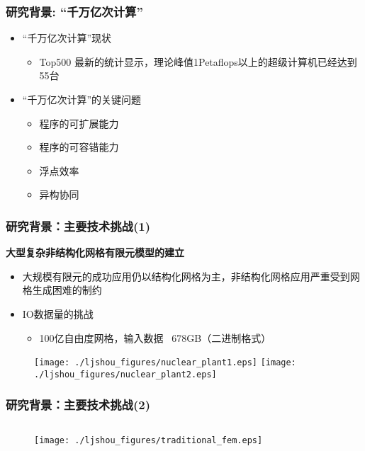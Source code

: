 \documentclass[mathserif]{beamer}
\begin{document}
\begin{CJK}{UTF8}{gkai}
	\begin{frame}
	  \frametitle{研究背景: “千万亿次计算”}
	  \begin{itemize}
		\item “千万亿次计算”现状
		   \begin{itemize}
			\item Top500 最新的统计显示，理论峰值1Petaflops以上的超级计算机已经达到55台
		   \end{itemize} 
		   
		\item “千万亿次计算”的关键问题
		   \begin{itemize}
			\item 程序的可扩展能力
			\item 程序的可容错能力
			\item 浮点效率
			\item 异构协同
		   \end{itemize}
	  \end{itemize}
	\end{frame}

	\begin{frame}
		\frametitle{研究背景：主要技术挑战(1)}
		{\color{red}\bf 大型复杂非结构化网格有限元模型的建立}
		\begin{itemize}
		  \item 大规模有限元的成功应用仍以结构化网格为主，非结构化网格应用严重受到网格生成困难的制约
		  \item IO数据量的挑战
		  \begin{itemize}
			\item 100亿自由度网格，输入数据 ~678GB（二进制格式）
		  \end{itemize}
		\end{itemize}
			\begin{figure}
				\centering
				\texttt{[image: ./ljshou\_figures/nuclear\_plant1.eps]}
				\texttt{[image: ./ljshou\_figures/nuclear\_plant2.eps]}
			\end{figure}
	\end{frame}

	\begin{frame}
		\frametitle{研究背景：主要技术挑战(2)}
		\begin{columns}
			\begin{column}[pos]{0.4\textwidth}
				\begin{figure}
					\texttt{[image: ./ljshou\_figures/traditional\_fem.eps]}
				\end{figure}
			\end{column}
			

\end{columns}
\end{frame}
\end{CJK}
\end{document}

